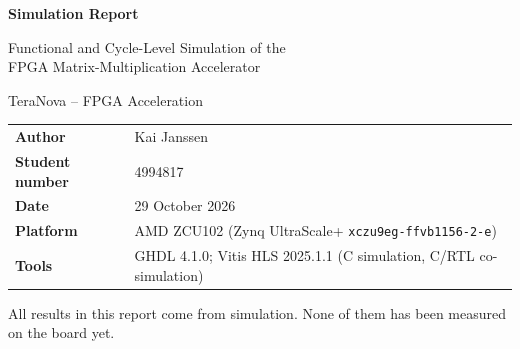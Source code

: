 \documentclass[11pt,a4paper]{article}
\newcommand{\code}[1]{\texttt{#1}}
\begin{document}
\begin{titlepage}
\centering
\vspace*{3cm}
{\LARGE\bfseries Simulation Report\par}
\vspace{0.5cm}
{\Large Functional and Cycle-Level Simulation of the\\FPGA Matrix-Multiplication Accelerator\par}
\vspace{0.3cm}
{\large TeraNova -- FPGA Acceleration\par}
\vspace{2cm}
\begin{tabular}{@{}ll@{}}
\textbf{Author}          & Kai Janssen \\
\textbf{Student number}  & 4994817 \\
\textbf{Date}            & 29 October 2026 \\
\textbf{Platform}        & AMD ZCU102 (Zynq UltraScale+ \code{xczu9eg-ffvb1156-2-e}) \\
\textbf{Tools}           & GHDL 4.1.0; Vitis HLS 2025.1.1 (C simulation, C/RTL co-simulation) \\
\end{tabular}
\vfill
{\small All results in this report come from simulation. None of them has been measured on the board yet.\par}
\end{titlepage}
\end{document}
